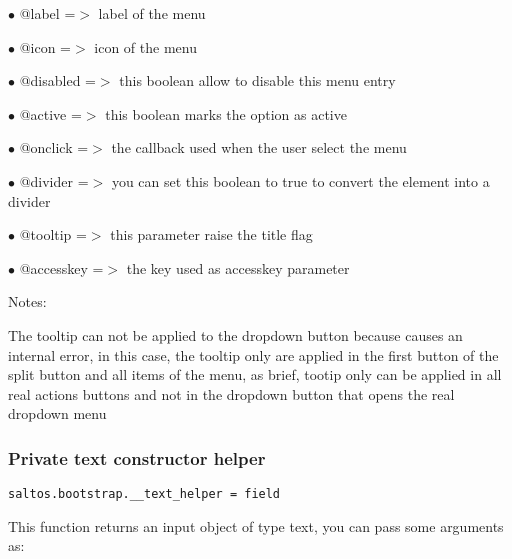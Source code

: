 \documentclass[a4paper]{article}
\begin{document}
\begin{compactitem}
\item[\color{myblue}$\bullet$] @label     =$>$ label of the menu
\item[\color{myblue}$\bullet$] @icon      =$>$ icon of the menu
\item[\color{myblue}$\bullet$] @disabled  =$>$ this boolean allow to disable this menu entry
\item[\color{myblue}$\bullet$] @active    =$>$ this boolean marks the option as active
\item[\color{myblue}$\bullet$] @onclick   =$>$ the callback used when the user select the menu
\item[\color{myblue}$\bullet$] @divider   =$>$ you can set this boolean to true to convert the element into a divider
\item[\color{myblue}$\bullet$] @tooltip   =$>$ this parameter raise the title flag
\item[\color{myblue}$\bullet$] @accesskey =$>$ the key used as accesskey parameter
\end{compactitem}

Notes:

The tooltip can not be applied to the dropdown button because causes an internal error,
in this case, the tooltip only are applied in the first button of the split button and
all items of the menu, as brief, tootip only can be applied in all real actions buttons
and not in the dropdown button that opens the real dropdown menu

\hypertarget{toc651}{}
\subsubsection{Private text constructor helper}

\begin{lstlisting}
saltos.bootstrap.__text_helper = field
\end{lstlisting}

This function returns an input object of type text, you can pass some arguments as:
\end{document}
